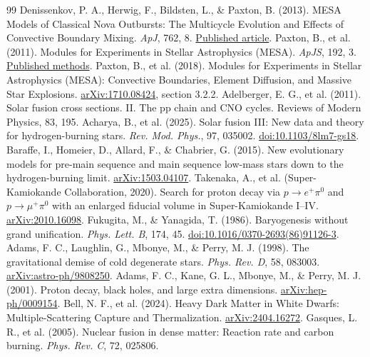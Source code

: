 \documentclass[11pt,letterpaper]{article}
\begin{document}
\begin{thebibliography}{99}
 Denissenkov, P. A., Herwig, F., Bildsten, L.,
\& Paxton, B. (2013). MESA Models of Classical Nova Outbursts: The Multicycle
Evolution and Effects of Convective Boundary Mixing. \emph{ApJ}, 762, 8.
\href{https://doi.org/10.1088/0004-637X/762/1/8}{Published article}.
 Paxton, B., et al. (2011).
Modules for Experiments in Stellar Astrophysics (MESA).
\emph{ApJS}, 192, 3.
\href{https://doi.org/10.1088/0067-0049/192/1/3}{Published methods}.
 Paxton, B., et al. (2018).
Modules for Experiments in Stellar Astrophysics (MESA): Convective Boundaries,
Element Diffusion, and Massive Star Explosions.
\href{https://arxiv.org/abs/1710.08424}{arXiv:1710.08424}, section 3.2.2.
 Adelberger, E. G., et al. (2011).
Solar fusion cross sections. II. The pp chain and CNO cycles.
Reviews of Modern Physics, 83, 195.
 Acharya, B., et al. (2025).
Solar fusion III: New data and theory for hydrogen-burning stars.
\emph{Rev. Mod. Phys.}, 97, 035002.
\href{https://doi.org/10.1103/8lm7-gs18}{doi:10.1103/8lm7-gs18}.
 Baraffe, I., Homeier, D., Allard, F., \& Chabrier, G. (2015).
New evolutionary models for pre-main sequence and main sequence low-mass stars
down to the hydrogen-burning limit.
\href{https://arxiv.org/abs/1503.04107}{arXiv:1503.04107}.
 Takenaka, A., et al. (Super-Kamiokande Collaboration, 2020).
Search for proton decay via $p\to e^+\pi^0$ and $p\to\mu^+\pi^0$
with an enlarged fiducial volume in Super-Kamiokande I--IV.
\href{https://arxiv.org/abs/2010.16098}{arXiv:2010.16098}.
 Fukugita, M., \& Yanagida, T. (1986).
Baryogenesis without grand unification. \emph{Phys. Lett. B}, 174, 45.
\href{https://doi.org/10.1016/0370-2693(86)91126-3}{doi:10.1016/0370-2693(86)91126-3}.
 Adams, F. C., Laughlin, G., Mbonye, M., \& Perry, M. J. (1998).
The gravitational demise of cold degenerate stars. \emph{Phys. Rev. D}, 58, 083003.
\href{https://arxiv.org/abs/astro-ph/9808250}{arXiv:astro-ph/9808250}.
 Adams, F. C., Kane, G. L., Mbonye, M., \& Perry, M. J. (2001).
Proton decay, black holes, and large extra dimensions.
\href{https://arxiv.org/abs/hep-ph/0009154}{arXiv:hep-ph/0009154}.
 Bell, N. F., et al. (2024).
Heavy Dark Matter in White Dwarfs: Multiple-Scattering Capture and Thermalization.
\href{https://arxiv.org/abs/2404.16272}{arXiv:2404.16272}.
 Gasques, L. R., et al. (2005).
Nuclear fusion in dense matter: Reaction rate and carbon burning.
\emph{Phys. Rev. C}, 72, 025806.

\end{thebibliography}
\end{document}
